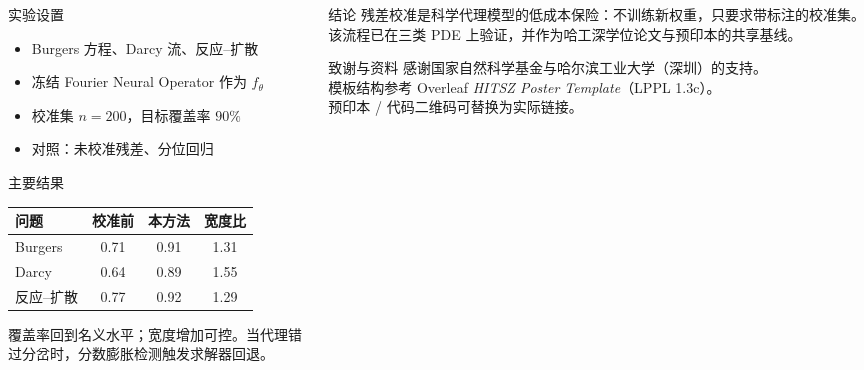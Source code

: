 \documentclass[final,t]{beamer}
\newlength{\colwidth}
\begin{document}
\begin{frame}[t]
\begin{columns}[t]
\begin{column}{\colwidth}
\begin{block}{实验设置}
\begin{itemize}
  \setlength{\itemsep}{6pt}
  \item Burgers 方程、Darcy 流、反应--扩散
  \item 冻结 Fourier Neural Operator 作为 $f_\theta$
  \item 校准集 $n=200$，目标覆盖率 $90\%$
  \item 对照：未校准残差、分位回归
\end{itemize}
\end{block}

\begin{block}{主要结果}
\renewcommand{\arraystretch}{1.25}
{\small
\begin{tabular}{@{}lccc@{}}
\toprule
问题 & 校准前 & 本方法 & 宽度比 \\
\midrule
Burgers & 0.71 & 0.91 & 1.31 \\
Darcy & 0.64 & 0.89 & 1.55 \\
反应--扩散 & 0.77 & 0.92 & 1.29 \\
\bottomrule
\end{tabular}}

\vspace{0.45em}
覆盖率回到名义水平；宽度增加可控。当代理错过分岔时，分数膨胀检测触发求解器回退。
\end{block}
\end{column}

\begin{column}{\colwidth}
\begin{block}{结论}
残差校准是科学代理模型的低成本保险：不训练新权重，只要求带标注的校准集。该流程已在三类 PDE 上验证，并作为哈工深学位论文与预印本的共享基线。
\end{block}

\begin{block}{致谢与资料}
感谢国家自然科学基金与哈尔滨工业大学（深圳）的支持。\\[0.3em]
模板结构参考 Overleaf \emph{HITSZ Poster Template}（LPPL 1.3c）。\\[0.3em]
{\footnotesize 预印本 / 代码二维码可替换为实际链接。}
\end{block}
\end{column}
\end{columns}

\end{frame}
\end{document}
